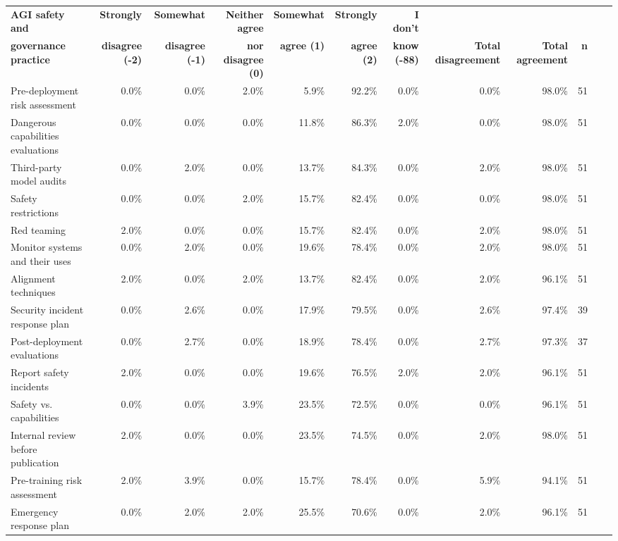 \documentclass{article}
\begin{document}
\begin{sidewaystable}
\fontsize{6}{8}\selectfont
\centering
\begin{tabular}{l *{11}{r}}
\toprule
\textbf{AGI safety and} & \textbf{Strongly} & \textbf{Somewhat} & \textbf{Neither agree} & \textbf{Somewhat} & \textbf{Strongly} & \textbf{I don't} & & & \\
\textbf{governance practice} & \textbf{disagree (-2)} & \textbf{disagree (-1)} & \textbf{nor disagree (0)} & \textbf{agree (1)} & \textbf{agree (2)} & \textbf{know (-88)} & \textbf{Total disagreement} & \textbf{Total agreement} & \textbf{n} \\
\midrule
Pre-deployment risk assessment & 0.0\% & 0.0\% & 2.0\% & 5.9\% & 92.2\% & 0.0\% & 0.0\% & 98.0\% & 51 \\
Dangerous capabilities evaluations & 0.0\% & 0.0\% & 0.0\% & 11.8\% & 86.3\% & 2.0\% & 0.0\% & 98.0\% & 51 \\
Third-party model audits & 0.0\% & 2.0\% & 0.0\% & 13.7\% & 84.3\% & 0.0\% & 2.0\% & 98.0\% & 51 \\
Safety restrictions & 0.0\% & 0.0\% & 2.0\% & 15.7\% & 82.4\% & 0.0\% & 0.0\% & 98.0\% & 51 \\
Red teaming & 2.0\% & 0.0\% & 0.0\% & 15.7\% & 82.4\% & 0.0\% & 2.0\% & 98.0\% & 51 \\
Monitor systems and their uses & 0.0\% & 2.0\% & 0.0\% & 19.6\% & 78.4\% & 0.0\% & 2.0\% & 98.0\% & 51 \\
Alignment techniques & 2.0\% & 0.0\% & 2.0\% & 13.7\% & 82.4\% & 0.0\% & 2.0\% & 96.1\% & 51 \\
Security incident response plan & 0.0\% & 2.6\% & 0.0\% & 17.9\% & 79.5\% & 0.0\% & 2.6\% & 97.4\% & 39 \\
Post-deployment evaluations & 0.0\% & 2.7\% & 0.0\% & 18.9\% & 78.4\% & 0.0\% & 2.7\% & 97.3\% & 37 \\
Report safety incidents & 2.0\% & 0.0\% & 0.0\% & 19.6\% & 76.5\% & 2.0\% & 2.0\% & 96.1\% & 51 \\
Safety vs. capabilities & 0.0\% & 0.0\% & 3.9\% & 23.5\% & 72.5\% & 0.0\% & 0.0\% & 96.1\% & 51 \\
Internal review before publication & 2.0\% & 0.0\% & 0.0\% & 23.5\% & 74.5\% & 0.0\% & 2.0\% & 98.0\% & 51 \\
Pre-training risk assessment & 2.0\% & 3.9\% & 0.0\% & 15.7\% & 78.4\% & 0.0\% & 5.9\% & 94.1\% & 51 \\
Emergency response plan & 0.0\% & 2.0\% & 2.0\% & 25.5\% & 70.6\% & 0.0\% & 2.0\% & 96.1\% & 51 \\

\end{tabular}
\end{sidewaystable}
\end{document}

